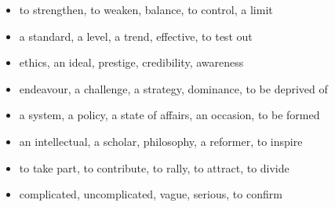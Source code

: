 \begin{itemize}
\raggedright
  \item to strengthen, to weaken, balance, to control, a limit
  \item a standard, a level, a trend, effective, to test out
  \item ethics, an ideal, prestige, credibility, awareness
  \item endeavour, a challenge, a strategy, dominance, to be deprived of
  \item a system, a policy, a state of affairs, an occasion, to be formed
  \item an intellectual, a scholar, philosophy, a reformer, to inspire
  \item to take part, to contribute, to rally, to attract, to divide
  \item complicated, uncomplicated, vague, serious, to confirm
\end{itemize}

